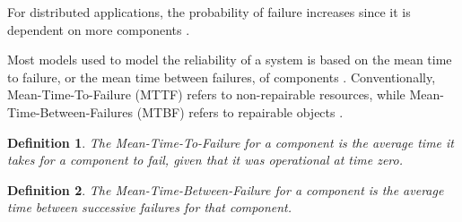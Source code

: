 \documentclass{cslthse-msc}
\newtheorem{definition}{Definition}[chapter]
\begin{document}
For distributed applications, the probability of failure increases since it is dependent on more components \cite{relModelDistSimSystem}.

Most models used to model the reliability of a system is based on the mean time to failure, or the mean time between failures, of components \cite{relModelAnalysis}. Conventionally, Mean-Time-To-Failure (MTTF) refers to non-repairable resources, while Mean-Time-Between-Failures (MTBF) refers to repairable objects \cite{effTaskReplMobGrid}.

\begin{definition} \label{def:mttf}
The Mean-Time-To-Failure for a component is the average time it takes for a component to fail, given that it was operational at time zero.
\end{definition}

\begin{definition} \label{def:mtbf}
The Mean-Time-Between-Failure for a component is the average time between successive failures for that component.
\end{definition}
\end{document}
